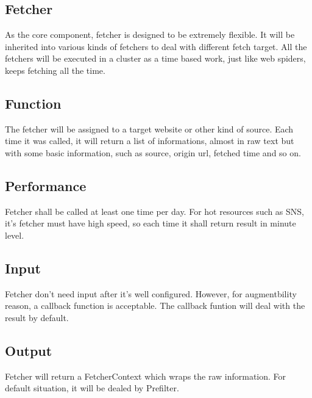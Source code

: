 
\subsection{Fetcher}
  As the core component, fetcher is designed to be extremely flexible.
  It will be inherited into various kinds of fetchers to deal with different fetch target.
  All the fetchers will be executed in a cluster as a time based work, just like web spiders, keeps fetching all the time.

  \subsection{Function}
    The fetcher will be assigned to a target website or other kind of source.
    Each time it was called, it will return a list of informations, almost in raw text but with some basic information,
    such as source, origin url, fetched time and so on.

  \subsection{Performance}
    Fetcher shall be called at least one time per day. For hot resources such as SNS, it's fetcher must have high speed,
    so each time it shall return result in minute level.

  \subsection{Input}
    Fetcher don't need input after it's well configured. However, for augmentbility reason, a callback function is acceptable.
    The callback funtion will deal with the result by default.

  \subsection{Output}
    Fetcher will return a FetcherContext which wraps the raw information. For default situation, it will be dealed by Prefilter.

